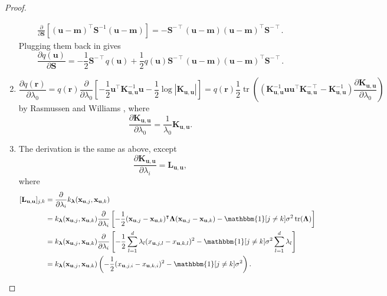 \documentclass{article}
\theoremstyle{definition}
\theoremstyle{remark}
\DeclareMathOperator{\tr}{tr}
\newcommand{\Kuu}{\mathbf{K}_{\mathbf{u},\mathbf{u}}}
\newcommand{\Luu}{\mathbf{L}_{\mathbf{u},\mathbf{u}}}
\newcommand{\dS}{\frac{\partial}{\partial\mathbf{S}}}
\newcommand{\dlz}{\frac{\partial}{\partial \lambda_0}}
\newcommand{\dl}{\frac{\partial}{\partial \lambda_i}}
\begin{document}
\begin{proof}
\begin{enumerate}
\begin{gather*}
      \dS[(\mathbf{u} - \mathbf{m})^\intercal\mathbf{S}^{-1}(\mathbf{u} -
      \mathbf{m})] = -\mathbf{S}^{-\intercal}(\mathbf{u} - \mathbf{m})(\mathbf{u} -
                     \mathbf{m})^\intercal\mathbf{S}^{-\intercal}.
    \end{gather*}
    Plugging them back in gives
    \[
      \frac{\partial q(\mathbf{u})}{\partial \mathbf{S}} =
      -\frac{1}{2}\mathbf{S}^{-\intercal}q(\mathbf{u}) +
      \frac{1}{2}q(\mathbf{u})\mathbf{S}^{-\intercal}(\mathbf{u} -
      \mathbf{m})(\mathbf{u} - \mathbf{m})^\intercal\mathbf{S}^{-\intercal}.
    \]
  \item
    \[
      \frac{\partial q(\mathbf{r})}{\partial \lambda_0} = q(\mathbf{r}) \dlz
      \left[-\frac{1}{2}\mathbf{u}^\intercal\Kuu^{-1}\mathbf{u} -
        \frac{1}{2}\log|\Kuu| \right] = q(\mathbf{r})\frac{1}{2}\tr
      \left((\Kuu^{-1}\mathbf{u}\mathbf{u}^\intercal\Kuu^{-\intercal} - \Kuu^{-1})
        \frac{\partial \Kuu}{\partial \lambda_0} \right)
    \]
    by Rasmussen and Williams \cite{DBLP:books/lib/RasmussenW06}, where
    \[
      \frac{\partial \Kuu}{\partial \lambda_0} = \frac{1}{\lambda_0}\Kuu.
    \]
  \item The derivation is the same as above, except
    \[
      \frac{\partial \Kuu}{\partial \lambda_i} = \Luu,
    \]
    where
    \[
      \begin{split}
        [\Luu]_{j,k} &= \dl k_{\bm\lambda}(\mathbf{x}_{\mathbf{u},j},
        \mathbf{x}_{\mathbf{u},k}) \\
        &= k_{\bm\lambda}(\mathbf{x}_{\mathbf{u},j}, \mathbf{x}_{\mathbf{u},k})
        \dl \left[-\frac{1}{2}(\mathbf{x}_{\mathbf{u},j} -
          \mathbf{x}_{\mathbf{u},k})^\intercal \bm\Lambda
          (\mathbf{x}_{\mathbf{u},j} - \mathbf{x}_{\mathbf{u},k}) -
          \mathbbm{1}[j \ne k]\sigma^2\tr(\bm\Lambda) \right] \\
        &= k_{\bm\lambda}(\mathbf{x}_{\mathbf{u},j}, \mathbf{x}_{\mathbf{u},k})
        \dl \left[-\frac{1}{2}\sum_{l=1}^d \lambda_l
          (x_{\mathbf{u},j,l} - x_{\mathbf{u},k,l})^2 -
          \mathbbm{1}[j \ne k]\sigma^2\sum_{l=1}^d \lambda_l \right] \\
        &= k_{\bm\lambda}(\mathbf{x}_{\mathbf{u},j}, \mathbf{x}_{\mathbf{u},k})
        \left( -\frac{1}{2}(x_{\mathbf{u},j,i} -
        x_{\mathbf{u},k,i})^2 - \mathbbm{1}[j \ne k]\sigma^2 \right).
      \end{split}
    \]
  \end{enumerate}
\end{proof}
\end{document}
